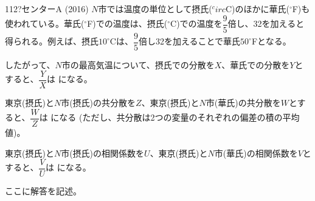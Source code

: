 \begin{prob}{112}{\hosi ?}{センターA (2016)}
 $N$市では温度の単位として摂氏(${^circ}$C)のほかに華氏(${}^\circ$F)も使われている。華氏(${}^\circ$F)での温度は、摂氏(${}^\circ$C)での温度を$\dfrac{9}{5}$倍し、32を加えると得られる。例えば、摂氏$10^\circ$Cは、$\dfrac{9}{5}$倍し32を加えることで華氏$50^\circ$Fとなる。

したがって、$N$市の最高気温について、摂氏での分散を$X$、華氏での分散を$Y$とすると、$\dfrac{Y}{X}$は  になる。

東京(摂氏)と$N$市(摂氏)の共分散を$Z$、東京(摂氏)と$N$市(華氏)の共分散を$W$とすると、$\dfrac{W}{Z}$は  になる (ただし、共分散は2つの変量のそれぞれの偏差の積の平均値)。

東京(摂氏)と$N$市(摂氏)の相関係数を$U$、東京(摂氏)と$N$市(華氏)の相関係数を$V$とすると、$\dfrac{V}{U}$は  になる。
\end{prob}
ここに解答を記述。